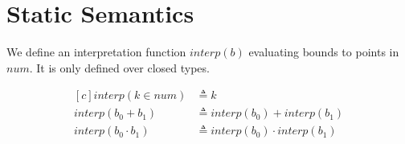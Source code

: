 \section{Static Semantics}
We define an interpretation function $interp(b)$ evaluating bounds to points in
$\textit{num}$. It is only defined over closed types.

\begin{equation}
  \begin{aligned}[c]
    interp(k \in \textit{num}) &\triangleq k \\
    interp(b_0 + b_1) &\triangleq interp(b_0) + interp(b_1) \\
    interp(b_0 \cdot b_1) &\triangleq interp(b_0) \cdot interp(b_1) \\
  \end{aligned}
\end{equation}

